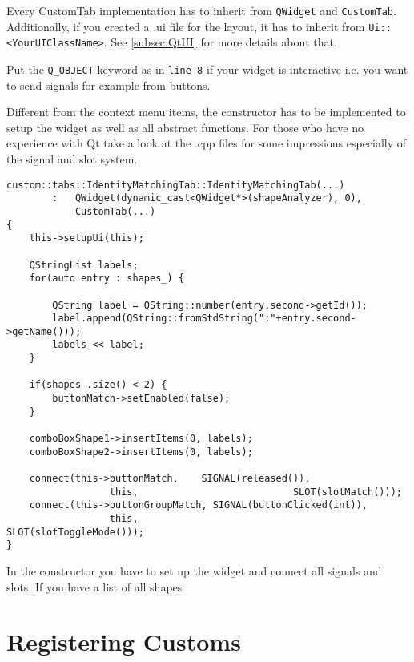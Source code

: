 Every CustomTab implementation has to inherit from \texttt{QWidget} and \texttt{CustomTab}. Additionally, if you created a .ui file for the layout, it has to inherit from \texttt{Ui::<YourUIClassName>}. See \ref{subsec:QtUI} for more details about that.

Put the \texttt{Q\_OBJECT} keyword as in \texttt{line 8} if your widget is interactive i.e. you want to send signals for example from buttons. 

Different from the context menu items, the constructor has to be implemented to setup the widget as well as all abstract functions. For those who have no experience with Qt take a look at the .cpp files for some impressions especially of the signal and slot system.

\begin{lstlisting}[style=lstStyleCpp, caption={IdentityMatchingTab.cpp, Constructor}]
custom::tabs::IdentityMatchingTab::IdentityMatchingTab(...)
        :   QWidget(dynamic_cast<QWidget*>(shapeAnalyzer), 0),
            CustomTab(...)
{
    this->setupUi(this);
    
    QStringList labels;
    for(auto entry : shapes_) {

        QString label = QString::number(entry.second->getId());
        label.append(QString::fromStdString(":"+entry.second->getName()));
        labels << label;
    }
    
    if(shapes_.size() < 2) {
        buttonMatch->setEnabled(false);
    }
    
    comboBoxShape1->insertItems(0, labels);
    comboBoxShape2->insertItems(0, labels);
    
    connect(this->buttonMatch,    SIGNAL(released()),
                  this,                           SLOT(slotMatch()));
    connect(this->buttonGroupMatch, SIGNAL(buttonClicked(int)),
                  this,                                  SLOT(slotToggleMode()));
}
\end{lstlisting}

In the constructor you have to set up the widget and connect all signals and slots. If you have a list of all shapes 

\section{Registering Customs}
\label{sec:RegisterCustoms}